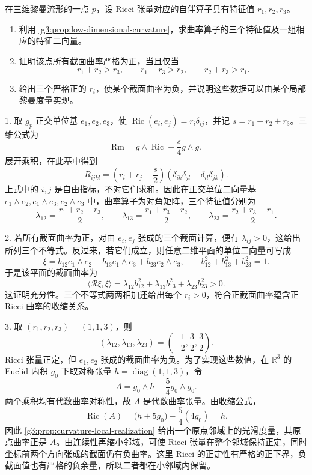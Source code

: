 \begin{exercise}\label{g3:ex:three-dimensional-ricci-positivity}
	在三维黎曼流形的一点 \(p\)，设 Ricci 张量对应的自伴算子具有特征值 \(r_1,r_2,r_3\)。
	\begin{enumerate}
		\item 利用 \cref{g3:prop:low-dimensional-curvature}，求曲率算子的三个特征值及一组相应的特征二向量。
		\item 证明该点所有截面曲率严格为正，当且仅当
		\[
			r_1+r_2>r_3,\qquad
			r_1+r_3>r_2,\qquad
			r_2+r_3>r_1.
		\]
		\item 给出三个严格正的 \(r_i\)，使某个截面曲率为负，并说明这些数据可以由某个局部黎曼度量实现。
	\end{enumerate}
\end{exercise}
\begin{solution}
	1. 取 \(g_p\) 正交单位基 \(e_1,e_2,e_3\)，使 \(\operatorname{Ric}(e_i,e_j)=r_i\delta_{ij}\)，并记 \(s=r_1+r_2+r_3\)。三维公式为
	\[
		\mathrm{Rm}=g\wedge\operatorname{Ric}-\frac{s}{4}g\wedge g.
	\]
	展开乘积，在此基中得到
	\[
		R_{ijkl}
		=\left(r_i+r_j-\frac{s}{2}\right)
			(\delta_{ik}\delta_{jl}-\delta_{il}\delta_{jk}).
	\]
	上式中的 \(i,j\) 是自由指标，不对它们求和。因此在正交单位二向量基
	\(e_1\wedge e_2,e_1\wedge e_3,e_2\wedge e_3\) 中，曲率算子为对角矩阵，三个特征值分别为
	\[
		\lambda_{12}=\frac{r_1+r_2-r_3}{2},\qquad
		\lambda_{13}=\frac{r_1+r_3-r_2}{2},\qquad
		\lambda_{23}=\frac{r_2+r_3-r_1}{2}.
	\]

	2. 若所有截面曲率为正，对由 \(e_i,e_j\) 张成的三个截面计算，便有 \(\lambda_{ij}>0\)，这给出所列三个不等式。反过来，若它们成立，则任意二维平面的单位二向量可写成
	\[
		\xi=b_{12}e_1\wedge e_2+b_{13}e_1\wedge e_3
			+b_{23}e_2\wedge e_3,\qquad
		b_{12}^2+b_{13}^2+b_{23}^2=1.
	\]
	于是该平面的截面曲率为
	\[
		\langle\mathcal R\xi,\xi\rangle
		=\lambda_{12}b_{12}^2+\lambda_{13}b_{13}^2
			+\lambda_{23}b_{23}^2>0.
	\]
	这证明充分性。三个不等式两两相加还给出每个 \(r_i>0\)，符合正截面曲率蕴含正 Ricci 曲率的收缩关系。

	3. 取 \((r_1,r_2,r_3)=(1,1,3)\)，则
	\[
		(\lambda_{12},\lambda_{13},\lambda_{23})
		=\left(-\frac12,\frac32,\frac32\right).
	\]
	Ricci 张量正定，但 \(e_1,e_2\) 张成的截面曲率为负。为了实现这些数值，在 \(\mathbb R^3\) 的 Euclid 内积 \(g_0\) 下取对称张量 \(h=\operatorname{diag}(1,1,3)\)，令
	\[
		A=g_0\wedge h-\frac54g_0\wedge g_0.
	\]
	两个乘积均有代数曲率对称性，故 \(A\) 是代数曲率张量。由收缩公式，
	\[
		\operatorname{Ric}(A)
		=\bigl(h+5g_0\bigr)-\frac54(4g_0)=h.
	\]
	因此 \cref{g3:prop:curvature-local-realization} 给出一个原点邻域上的光滑度量，其原点曲率正是 \(A\)。由连续性再缩小邻域，可使 Ricci 张量在整个邻域保持正定，同时坐标前两个方向张成的截面仍有负曲率。这里 Ricci 的正定性有严格的正下界，负截面值也有严格的负余量，所以二者都在小邻域内保留。
\end{solution}

